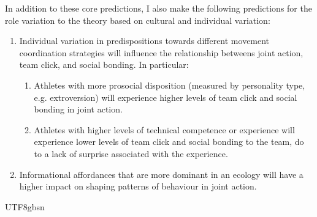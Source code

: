 \begin{CJK}{UTF8}{gbsn}
In addition to these core predictions, I also make the following predictions for the role variation to the theory based on cultural and individual variation:

\begin{enumerate}
  \item Individual variation in predispositions towards different movement coordination strategies will influence the relationship betweens joint action, team click, and social bonding.  In particular:
      \begin{enumerate}
        \item Athletes with more prosocial disposition (measured by personality type, e.g. extroversion) will experience higher levels of team click and social bonding in joint action.
        \item Athletes with higher levels of technical competence or experience will experience lower levels of team click and social bonding to the team, do to a lack of surprise associated with the experience.
      \end{enumerate}

  \item Informational affordances that are more dominant in an ecology will have a higher impact on shaping patterns of behaviour in joint action.

\end{enumerate}














                                              \end{CJK}{UTF8}{gbsn}
